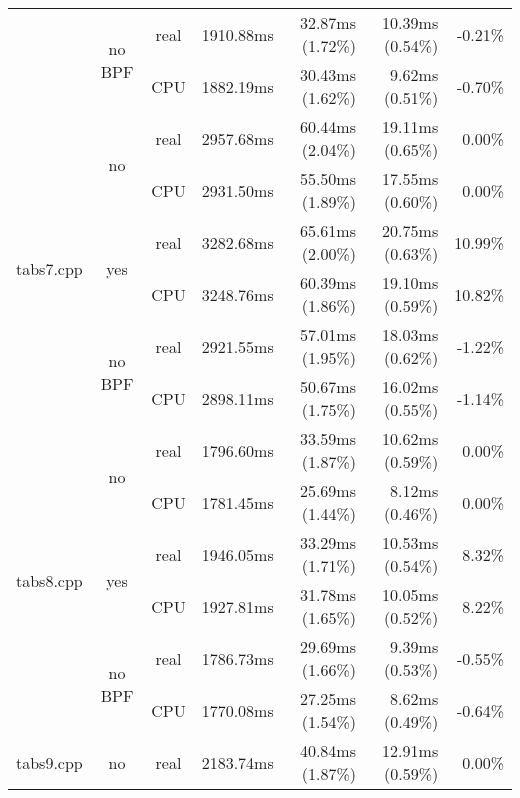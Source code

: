 \documentclass[en]{pracamgr}
\begin{document}
\begin{small}
\begin{longtable}{|l|c|c|r|r|r|r|}
                            \cline{2-7}
                            & \multirow{2}{*}{no BPF} & real & 1910.88ms & 32.87ms (1.72\%) & 10.39ms (0.54\%) & -0.21\% \\*
                            &                         & CPU  & 1882.19ms & 30.43ms (1.62\%) & 9.62ms (0.51\%) & -0.70\% \\
\hline
\multirow{6}{*}{tabs7.cpp}  & \multirow{2}{*}{no}     & real & 2957.68ms & 60.44ms (2.04\%) & 19.11ms (0.65\%) & 0.00\% \\*
                            &                         & CPU  & 2931.50ms & 55.50ms (1.89\%) & 17.55ms (0.60\%) & 0.00\% \\*
                            \cline{2-7}
                            & \multirow{2}{*}{yes}    & real & 3282.68ms & 65.61ms (2.00\%) & 20.75ms (0.63\%) & 10.99\% \\*
                            &                         & CPU  & 3248.76ms & 60.39ms (1.86\%) & 19.10ms (0.59\%) & 10.82\% \\*
                            \cline{2-7}
                            & \multirow{2}{*}{no BPF} & real & 2921.55ms & 57.01ms (1.95\%) & 18.03ms (0.62\%) & -1.22\% \\*
                            &                         & CPU  & 2898.11ms & 50.67ms (1.75\%) & 16.02ms (0.55\%) & -1.14\% \\
\hline
\multirow{6}{*}{tabs8.cpp}  & \multirow{2}{*}{no}     & real & 1796.60ms & 33.59ms (1.87\%) & 10.62ms (0.59\%) & 0.00\% \\*
                            &                         & CPU  & 1781.45ms & 25.69ms (1.44\%) & 8.12ms (0.46\%) & 0.00\% \\*
                            \cline{2-7}
                            & \multirow{2}{*}{yes}    & real & 1946.05ms & 33.29ms (1.71\%) & 10.53ms (0.54\%) & 8.32\% \\*
                            &                         & CPU  & 1927.81ms & 31.78ms (1.65\%) & 10.05ms (0.52\%) & 8.22\% \\*
                            \cline{2-7}
                            & \multirow{2}{*}{no BPF} & real & 1786.73ms & 29.69ms (1.66\%) & 9.39ms (0.53\%) & -0.55\% \\*
                            &                         & CPU  & 1770.08ms & 27.25ms (1.54\%) & 8.62ms (0.49\%) & -0.64\% \\
\hline
\multirow{6}{*}{tabs9.cpp}  & \multirow{2}{*}{no}     & real & 2183.74ms & 40.84ms (1.87\%) & 12.91ms (0.59\%) & 0.00\% \\*

\end{longtable}
\end{small}
\end{document}
